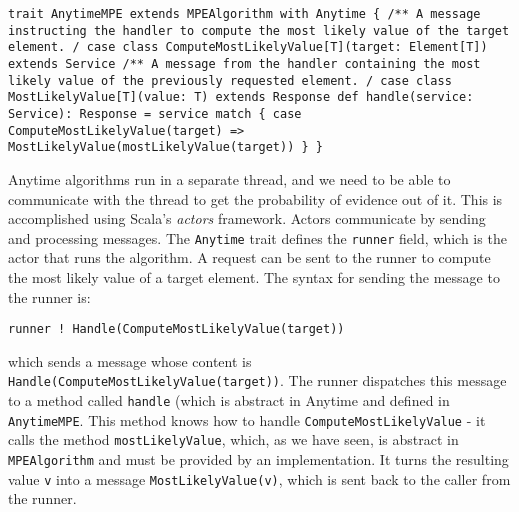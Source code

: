 \begin{flushleft}
\texttt{trait AnytimeMPE extends MPEAlgorithm with Anytime \{
\newline \tab /**
\newline \tab * A message instructing the handler to compute the most likely
value of the target element.
\newline \tab */
\newline \tab case class ComputeMostLikelyValue[T](target: Element[T]) extends
Service
\newline 
\newline \tab /**
\newline \tab * A message from the handler containing the most likely value of the previously requested element.
\newline \tab */
\newline 
\newline \tab case class MostLikelyValue[T](value: T) extends Response
\newline 
\newline \tab def handle(service: Service): Response =
\newline \tab service match \{
\newline \tab case ComputeMostLikelyValue(target) =>
\newline \tab MostLikelyValue(mostLikelyValue(target))
\newline \}
\newline \}
}
\end{flushleft}

Anytime algorithms run in a separate thread, and we need to be able to communicate with the thread to get the probability of evidence out of it. This is accomplished using Scala's \emph{actors} framework.  Actors communicate by sending and processing messages. The \texttt{Anytime} trait defines the \texttt{runner} field, which is the actor that runs the algorithm. A request can be sent to the runner to compute the most likely value of a target element. The syntax for sending the message to the runner is:

\begin{flushleft}
\texttt{runner ! Handle(ComputeMostLikelyValue(target))}
\end{flushleft}

which sends a message whose content is \texttt{Handle(ComputeMostLikely\-Value(target))}. The runner dispatches this message to a method called \texttt{handle} (which is abstract in Anytime and defined in \texttt{AnytimeMPE}. This method knows how to handle \texttt{ComputeMostLikelyValue} - it calls the method \texttt{mostLike\-lyValue}, which, as we have seen, is abstract in \texttt{MPEAlgorithm} and must be provided by an implementation. It turns the resulting value \texttt{v} into a message \texttt{MostLikelyValue(v)}, which is sent back to the caller from the runner.

